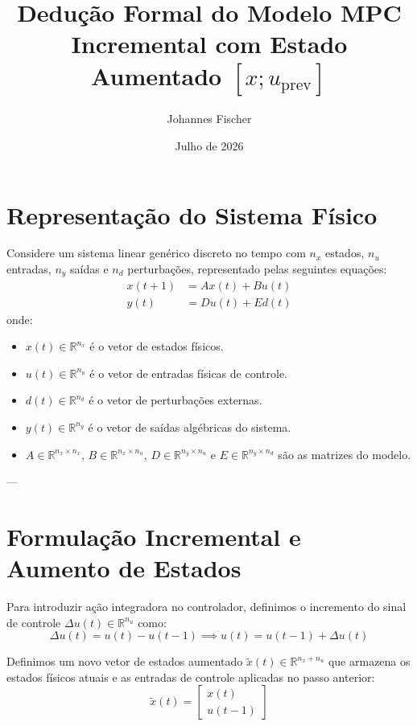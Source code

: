 \documentclass[12pt]{article}
\title{Dedução Formal do Modelo MPC Incremental com Estado Aumentado $[x; u_{\text{prev}}]$}
\author{Johannes Fischer}
\date{Julho de 2026}
\begin{document}
\maketitle

\section{Representação do Sistema Físico}

Considere um sistema linear genérico discreto no tempo com $n_x$ estados, $n_u$ entradas, $n_y$ saídas e $n_d$ perturbações, representado pelas seguintes equações:
\begin{subequations}
\label{eq:sistema_fisico}
\begin{align}
x(t+1) &= A x(t) + B u(t) \\
y(t) &= D u(t) + E d(t)
\end{align}
\end{subequations}
onde:
\begin{itemize}
    \item $x(t) \in \mathbb{R}^{n_x}$ é o vetor de estados físicos.
    \item $u(t) \in \mathbb{R}^{n_u}$ é o vetor de entradas físicas de controle.
    \item $d(t) \in \mathbb{R}^{n_d}$ é o vetor de perturbações externas.
    \item $y(t) \in \mathbb{R}^{n_y}$ é o vetor de saídas algébricas do sistema.
    \item $A \in \mathbb{R}^{n_x \times n_x}$, $B \in \mathbb{R}^{n_x \times n_u}$, $D \in \mathbb{R}^{n_y \times n_u}$ e $E \in \mathbb{R}^{n_y \times n_d}$ são as matrizes do modelo.
\end{itemize}

---

\section{Formulação Incremental e Aumento de Estados}

Para introduzir ação integradora no controlador, definimos o incremento do sinal de controle $\Delta u(t) \in \mathbb{R}^{n_u}$ como:
\begin{equation}
\label{eq:delta_u}
\Delta u(t) = u(t) - u(t-1) \implies u(t) = u(t-1) + \Delta u(t)
\end{equation}

Definimos um novo vetor de estados aumentado $\tilde{x}(t) \in \mathbb{R}^{n_x + n_u}$ que armazena os estados físicos atuais e as entradas de controle aplicadas no passo anterior:
\begin{equation}
\tilde{x}(t) = \begin{bmatrix} x(t) \\ u(t-1) \end{bmatrix}
\end{equation}
\end{document}
